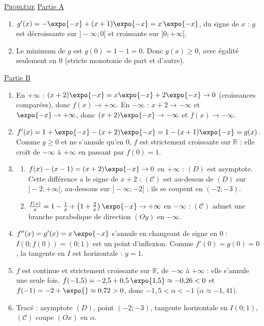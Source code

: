 \begin{corrige}
\noindent \underline{\textsc{Probl\`eme}} \newline
\underline{Partie A}
\begin{enumerate}
\item $g'(x) = -\expo{-x} + (x+1)\expo{-x} = x\,\expo{-x}$, du signe de $x$ : $g$ est d\'ecroissante sur $]-\infty ; 0]$
      et croissante sur $[0 ; +\infty[$.
\item Le minimum de $g$ est $g(0) = 1 - 1 = 0$. Donc $g(x) \geq 0$, avec \'egalit\'e seulement en $0$ (stricte monotonie de part et d'autre).
\end{enumerate}
\underline{Partie B}
\begin{enumerate}
\item En $+\infty$ : $(x + 2)\expo{-x} = x\expo{-x} + 2\expo{-x} \to 0$ (croissances compar\'ees), donc $f(x) \to +\infty$.
      En $-\infty$ : $x + 2 \to -\infty$ et $\expo{-x} \to +\infty$, donc $(x+2)\expo{-x} \to -\infty$ et $f(x) \to -\infty$.
\item $f'(x) = 1 + \expo{-x} - (x + 2)\expo{-x} = 1 - (x+1)\expo{-x} = g(x)$. Comme $g \geq 0$ et ne s'annule qu'en $0$,
      $f$ est strictement croissante sur $\mathbb{R}$ : elle cro\^it de $-\infty$ \`a $+\infty$ en passant par $f(0) = 1$.
\item \begin{enumerate}
      \item $f(x) - (x - 1) = (x + 2)\expo{-x} \to 0$ en $+\infty$ : $(D)$ est asymptote. Cette diff\'erence a le signe de $x + 2$ :
            $(\mathscr{C})$ est au-dessus de $(D)$ sur $]-2 ; +\infty[$, au-dessous sur $]-\infty ; -2[$ ; ils se coupent en $(-2 ; -3)$.
      \item $\frac{f(x)}{x} = 1 - \frac{1}{x} + \left(1 + \frac{2}{x}\right)\expo{-x} \to +\infty$ en $-\infty$ :
            $(\mathscr{C})$ admet une branche parabolique de direction $(Oy)$ en $-\infty$.
      \end{enumerate}
\item $f''(x) = g'(x) = x\,\expo{-x}$ s'annule en changeant de signe en $0$ : $I(0 ; f(0)) = (0 ; 1)$ est un point d'inflexion.
      Comme $f'(0) = g(0) = 0$, la tangente en $I$ est horizontale : $y = 1$.
\item $f$ est continue et strictement croissante sur $\mathbb{R}$, de $-\infty$ \`a $+\infty$ : elle s'annule une seule fois.
      $f(-1{,}5) = -2{,}5 + 0{,}5\,\expo{1{,}5} \approx -0{,}26 < 0$ et $f(-1) = -2 + \expo{} \approx 0{,}72 > 0$, donc
      $-1{,}5 < \alpha < -1$ ($\alpha \approx -1{,}41$).
\item Trac\'e : asymptote $(D)$, point $(-2 ; -3)$, tangente horizontale en $I(0;1)$, $(\mathscr{C})$ coupe $(Ox)$ en $\alpha$.

\end{enumerate}
\end{corrige}
